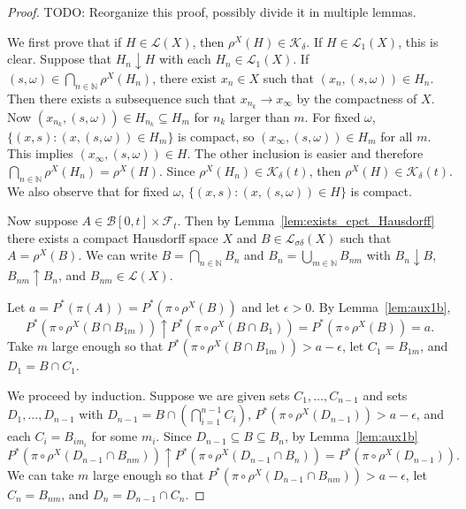 \begin{proof}

  TODO: Reorganize this proof, possibly divide it in multiple lemmas.

  We first prove that if $H \in \mathcal{L}(X)$, then $\rho^X(H) \in \mathcal{K}_\delta$. If $H \in \mathcal{L}_1(X)$,
  this is clear. Suppose that $H_n \downarrow H$ with each $H_n \in \mathcal{L}_1(X)$.
  If $(s,\omega) \in \bigcap_{n \in \mathbb{N}} \rho^X(H_n)$, there exist
  $x_n \in X$ such that $(x_n,(s,\omega)) \in H_n$. Then there exists a subsequence
  such that $x_{n_k} \to x_\infty$ by the compactness of $X$. Now $(x_{n_k},(s,\omega)) \in H_{n_k}
  \subseteq H_m$ for $n_k$ larger than $m$. For fixed $\omega$, $\{(x,s): (x,(s,\omega)) \in H_m\}$
  is compact, so $(x_\infty,(s,\omega)) \in H_m$ for all $m$. This implies
  $(x_\infty,(s,\omega)) \in H$. The other inclusion is easier and therefore $\bigcap_{n \in \mathbb{N}} \rho^X(H_n) = \rho^X(H)$.
  Since $\rho^X(H_n) \in \mathcal{K}_\delta(t)$, then $\rho^X(H) \in \mathcal{K}_\delta(t)$.
  We also observe that for fixed $\omega$, $\{(x,s):(x,(s,\omega)) \in H\}$
  is compact.

  Now suppose $A \in \mathcal{B}[0,t] \times \mathcal{F}_t$. Then by Lemma~\ref{lem:exists_cpct_Hausdorff}
  there exists a compact Hausdorff space $X$ and $B \in \mathcal{L}_{\sigma\delta}(X)$ such that $A = \rho^X(B)$. We can write
  $B = \bigcap_{n \in \mathbb{N}} B_n$ and $B_n = \bigcup_{m \in \mathbb{N}} B_{nm}$ with $B_n \downarrow B$, $B_{nm} \uparrow B_n$, and $B_{nm} \in \mathcal{L}(X)$.

  Let $a = P^*(\pi(A)) = P^*(\pi \circ \rho^X(B))$ and let $\epsilon > 0$.
  By Lemma~\ref{lem:aux1b},
  $$P^*(\pi \circ \rho^X(B \cap B_{1m})) \uparrow P^*(\pi \circ \rho^X(B \cap B_1))
  = P^*(\pi \circ \rho^X(B)) = a.$$
  Take $m$ large enough so that $P^*(\pi \circ \rho^X(B \cap B_{1m})) > a - \epsilon$,
  let $C_1 = B_{1m}$, and $D_1 = B \cap C_1$.

  We proceed by induction. Suppose we are given sets $C_1, \ldots, C_{n-1}$ and
  sets $D_1, \ldots, D_{n-1}$ with $D_{n-1} = B \cap \left(\bigcap_{i=1}^{n-1} C_i\right)$, $P^*(\pi
  \circ \rho^X(D_{n-1})) > a - \epsilon$, and each $C_i = B_{im_i}$ for
  some $m_i$. Since $D_{n-1} \subseteq B \subseteq B_n$, by Lemma~\ref{lem:aux1b}
  $$P^*(\pi \circ \rho^X(D_{n-1} \cap B_{nm}))
  \uparrow P^*(\pi \circ \rho^X(D_{n-1} \cap B_n))
  = P^*(\pi \circ \rho^X(D_{n-1})).$$
  We can take $m$ large enough so that
  $P^*(\pi \circ \rho^X(D_{n-1} \cap B_{nm})) > a - \epsilon$, let $C_n = B_{nm}$, and $D_n = D_{n-1} \cap C_n$.


\end{proof}
